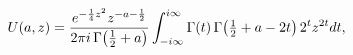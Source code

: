 \[\mathop{U\/}\nolimits\!\left(a,z\right)=\frac{e^{-\frac{1}{4}z^{2}}z^{-a-\frac%
{1}{2}}}{2\pi i\mathop{\Gamma\/}\nolimits\!\left(\frac{1}{2}+a\right)}\*\int_{%
-i\infty}^{i\infty}\mathop{\Gamma\/}\nolimits\!\left(t\right)\mathop{\Gamma\/}%
\nolimits\!\left(\tfrac{1}{2}+a-2t\right)2^{t}z^{2t}dt,\]